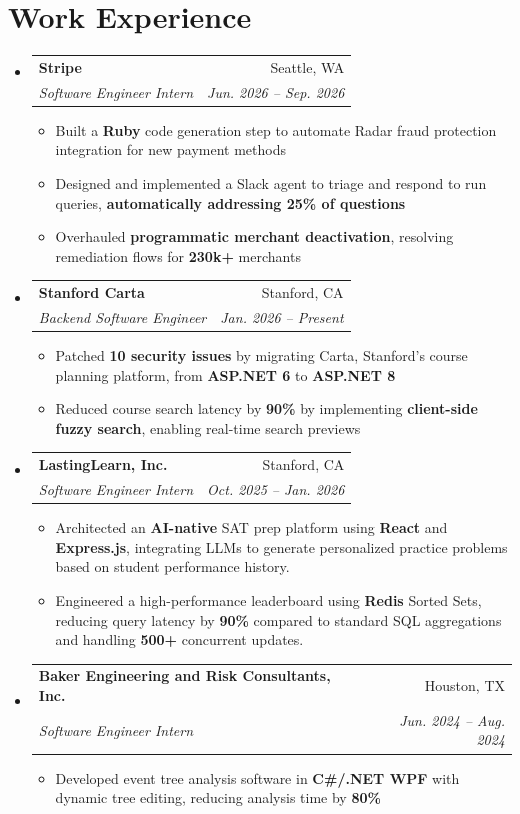 \documentclass[letterpaper,11pt]{article}
\makeatletter
\newcommand{\resumeItem}[1]{
  \item\small{
    {#1 \vspace{-2pt}}
  }
}
\newcommand{\resumeSubheading}[4]{
  \vspace{-2pt}\item
    \begin{tabular*}{0.97\textwidth}[t]{l@{\extracolsep{\fill}}r}
      \textbf{#1} & #2 \\
      \textit{\small#3} & \textit{\small #4} \\
    \end{tabular*}\vspace{-7pt}
}
\newcommand{\resumeSubHeadingListStart}{\begin{itemize}[leftmargin=0.15in, label={}]}
\newcommand{\resumeSubHeadingListEnd}{\end{itemize}}
\newcommand{\resumeItemListStart}{\begin{itemize}}
\newcommand{\resumeItemListEnd}{\end{itemize}\vspace{-5pt}}
\makeatother
\begin{document}
\section{Work Experience}
  \resumeSubHeadingListStart
    \resumeSubheading
      {Stripe}{Seattle, WA}
      {Software Engineer Intern}{Jun. 2026 -- Sep. 2026}
      \resumeItemListStart
        \resumeItem{Built a \textbf{Ruby} code generation step to automate Radar fraud protection integration for new payment methods}
        \resumeItem{Designed and implemented a Slack agent to triage and respond to run queries, \textbf{automatically addressing 25\% of questions}}
        \resumeItem{Overhauled \textbf{programmatic merchant deactivation}, resolving remediation flows for \textbf{230k+} merchants}
      \resumeItemListEnd
    \resumeSubheading
      {Stanford Carta}{Stanford, CA}
      {Backend Software Engineer}{Jan. 2026 -- Present}
      \resumeItemListStart
        \resumeItem{Patched \textbf{10 security issues} by migrating Carta, Stanford's course planning platform, from \textbf{ASP.NET 6} to \textbf{ASP.NET 8}}
        \resumeItem{Reduced course search latency by \textbf{90\%} by implementing \textbf{client-side fuzzy search}, enabling real-time search previews}
      \resumeItemListEnd
     \resumeSubheading
      {LastingLearn, Inc.}{Stanford, CA}
      {Software Engineer Intern}{Oct. 2025 -- Jan. 2026}
      \resumeItemListStart
        \resumeItem{Architected an \textbf{AI-native} SAT prep platform using \textbf{React} and \textbf{Express.js}, integrating LLMs to generate personalized practice problems based on student performance history.}
        \resumeItem{Engineered a high-performance leaderboard using \textbf{Redis} Sorted Sets, reducing query latency by \textbf{90\%} compared to standard SQL aggregations and handling \textbf{500+} concurrent updates.}
      \resumeItemListEnd
     \resumeSubheading
      {Baker Engineering and Risk Consultants, Inc.}{Houston, TX}
      {Software Engineer Intern}{Jun. 2024 -- Aug. 2024}
      \resumeItemListStart
        \resumeItem{Developed event tree analysis software in \textbf{C\#/.NET WPF} with dynamic tree editing, reducing analysis time by \textbf{80\%}}
      \resumeItemListEnd
  \resumeSubHeadingListEnd
\end{document}
